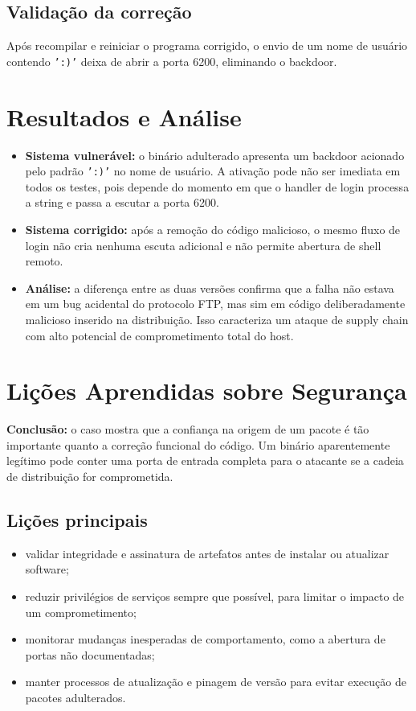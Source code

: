 \documentclass[12pt,a4paper]{article}
\begin{document}
\subsection{Validação da correção}
Após recompilar e reiniciar o programa corrigido, o envio de um nome de usuário contendo \texttt{':)'} deixa de abrir a porta 6200, eliminando o backdoor.

\section{Resultados e Análise}
\begin{itemize}
	\item \textbf{Sistema vulnerável:} o binário adulterado apresenta um backdoor acionado pelo padrão \texttt{':)'} no nome de usuário. A ativação pode não ser imediata em todos os testes, pois depende do momento em que o handler de login processa a string e passa a escutar a porta 6200.
	\item \textbf{Sistema corrigido:} após a remoção do código malicioso, o mesmo fluxo de login não cria nenhuma escuta adicional e não permite abertura de shell remoto.
	\item \textbf{Análise:} a diferença entre as duas versões confirma que a falha não estava em um bug acidental do protocolo FTP, mas sim em código deliberadamente malicioso inserido na distribuição. Isso caracteriza um ataque de supply chain com alto potencial de comprometimento total do host.
\end{itemize}

\section{Lições Aprendidas sobre Segurança}
\textbf{Conclusão:} o caso mostra que a confiança na origem de um pacote é tão importante quanto a correção funcional do código. Um binário aparentemente legítimo pode conter uma porta de entrada completa para o atacante se a cadeia de distribuição for comprometida.

\subsection{Lições principais}
\begin{itemize}
	\item validar integridade e assinatura de artefatos antes de instalar ou atualizar software;
	\item reduzir privilégios de serviços sempre que possível, para limitar o impacto de um comprometimento;
	\item monitorar mudanças inesperadas de comportamento, como a abertura de portas não documentadas;
	\item manter processos de atualização e pinagem de versão para evitar execução de pacotes adulterados.
\end{itemize}
\end{document}
